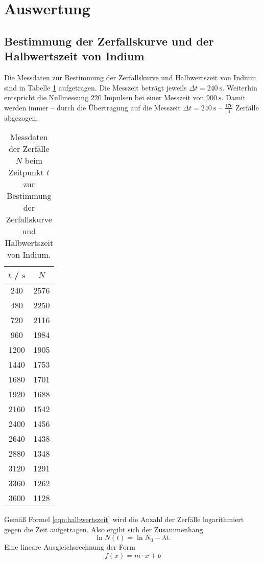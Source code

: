 \section{Auswertung}
\label{sec:Auswertung}

\subsection{Bestimmung der Zerfallskurve und der Halbwertszeit von Indium}
Die Messdaten zur Bestimmung der Zerfallskurve und Halbwertszeit von Indium sind in Tabelle 
\ref{tab:indium} aufgetragen. 
Die Messzeit beträgt jeweils $\Delta t = \SI{240}{\second}$.
Weiterhin entspricht die Nullmessung $220$ Impulsen bei einer Messzeit von $\SI{900}{\second}$.
Damit werden immer -- durch die Übertragung auf die Messzeit $\Delta t = \SI{240}{\second}$ --
$\frac{176}{3}$ Zerfälle abgezogen.
\begin{table}
	\centering
	\caption{Messdaten der Zerfälle $N$ beim Zeitpunkt $t$ zur Bestimmung der Zerfallskurve und Halbwertszeit von Indium.}
	\label{tab:indium}
	\begin{tabular}{cc}
		\toprule
		$t$ / $\si{\second}$ & $N$ \\
		\midrule
		240 & 2576 \\
		480 & 2250 \\
		720 & 2116 \\
		960 & 1984 \\
		1200 & 1905 \\
		1440 & 1753 \\
		1680 & 1701 \\
		1920 & 1688 \\
		2160 & 1542 \\
		2400 & 1456 \\
		2640 & 1438 \\
		2880 & 1348 \\
		3120 & 1291 \\
		3360 & 1262 \\
		3600 & 1128 \\
		\bottomrule
	\end{tabular}
\end{table}
Gemäß Formel \eqref{eqn:halbwertszeit} wird die Anzahl der Zerfälle logarithmiert gegen die
Zeit aufgetragen.
Also ergibt sich der Zusammenhang
\begin{equation}
	\label{eqn:Halbwertszeit2}
	\ln N(t) = \ln N_0 - \lambda t \mathrm{.}
\end{equation}
Eine lineare Ausgleichsrechnung der Form
\begin{equation*}
	f(x) = m \cdot x + b
\end{equation*}
